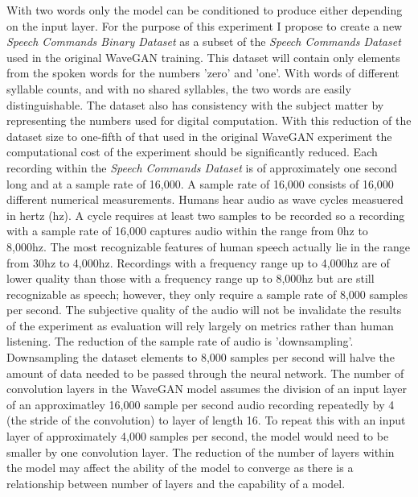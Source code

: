 \documentclass[a4paper, dvipsnames, titlepage]{article}
\begin{document}
With two words only the model can be conditioned to produce either depending on the input layer.
\newline
\newline
For the purpose of this experiment I propose to create a new \textit{Speech Commands Binary Dataset} as a subset of the \textit{Speech Commands Dataset} used in the original WaveGAN training.
This dataset will contain only elements from the spoken words for the numbers 'zero' and 'one'.
With words of different syllable counts, and with no shared syllables, the two words are easily distinguishable.
The dataset also has consistency with the subject matter by representing the numbers used for digital computation.
With this reduction of the dataset size to one-fifth of that used in the original WaveGAN experiment the computational cost of the experiment should be significantly reduced.
\newline
\newline
Each recording within the \textit{Speech Commands Dataset} is of approximately one second long and at a sample rate of 16,000.
A sample rate of 16,000 consists of 16,000 different numerical measurements.
Humans hear audio as wave cycles measuered in hertz (hz).
A cycle requires at least two samples to be recorded so a recording with a sample rate of 16,000 captures audio within the range from 0hz to 8,000hz.
The most recognizable features of human speech actually lie in the range from 30hz to 4,000hz.
Recordings with a frequency range up to 4,000hz are of lower quality than those with a frequency range up to 8,000hz but are still recognizable as speech; however, they only require a sample rate of 8,000 samples per second.
The subjective quality of the audio will not be invalidate the results of the experiment as evaluation will rely largely on metrics rather than human listening.
\newline
\newline
The reduction of the sample rate of audio is 'downsampling'.
Downsampling the dataset elements to 8,000 samples per second will halve the amount of data needed to be passed through the neural network.
The number of convolution layers in the WaveGAN model assumes the division of an input layer of an approximatley 16,000 sample per second audio recording repeatedly by 4 (the stride of the convolution) to layer of length 16.
To repeat this with an input layer of approximately 4,000 samples per second, the model would need to be smaller by one convolution layer.
The reduction of the number of layers within the model may affect the ability of the model to converge as there is a relationship between number of layers and the capability of a model.
\end{document}
